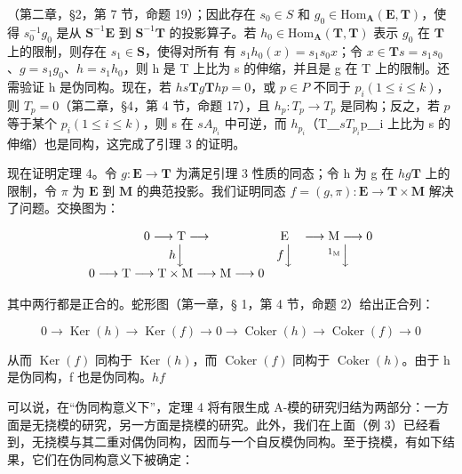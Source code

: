 （第二章，§2，第 7 节，命题 19）；因此存在 \(s_0 \in S\) 和 \(g_0 \in \mathrm{Hom}_{\mathbf{A}}(\mathbf{E}, \mathbf{T})\)，使得 \(s_0^{-1}g_0\) 是从 \(\mathbf{S}^{-1}\mathbf{E}\) 到 \(\mathbf{S}^{-1}\mathbf{T}\) 的投影算子。若 \(h_0 \in \mathrm{Hom}_{\mathbf{A}}(\mathbf{T}, \mathbf{T})\) 表示 \(g_0\) 在 \(\mathbf{T}\) 上的限制，则存在 \(s_1 \in \mathbf{S}\)，使得对所有  有 \(s_1h_0(x) = s_1s_0x\)；令 \(x \in \mathbf{T}\)\(s = s_1s_0\)、\(g = s_1g_0\)、\(h = s_1h_0\)，则 h 是 T 上比为 s 的伸缩，并且是 g 在 T 上的限制。还需验证 h 是伪同构。现在，若 \(h\)\(s\)\(\mathbf{T}\)\(g\)\(\mathbf{T}\)\(h\)\(p = 0\)，或 \(p \in P\) 不同于 \(p_i (1 \leqslant i \leqslant k)\)，则 \(T_p = 0\)（第二章，§4，第 4 节，命题 17），且 \(h_p: T_p \to T_p\) 是同构；反之，若 \(p\) 等于某个 \(p_i (1 \leqslant i \leqslant k)\)，则 s 在 \(s\)\(A_{p_i}\) 中可逆，而 \(h_{p_i}\)（T＿\(s\)\(T_{p_i}\)p＿i 上比为 s 的伸缩）也是同构，这完成了引理 3 的证明。

现在证明定理 4。令 \(g: \mathbf{E} \to \mathbf{T}\) 为满足引理 3 性质的同态；令 h 为 g 在 \(h\)\(g\)\(\mathbf{T}\) 上的限制，令 \(\pi\) 为 \(\mathbf{E}\) 到 \(\mathbf{M}\) 的典范投影。我们证明同态 \(f = (g, \pi): \mathbf{E} \to \mathbf{T} \times \mathbf{M}\) 解决了问题。交换图为：

\[
\begin{array}{c c c} 0 \longrightarrow \mathrm{T} \longrightarrow & \mathrm{E} & \longrightarrow \mathrm{M} \longrightarrow 0 \\ h \Big \downarrow & f \Big \downarrow & ^ {1 _ {\mathrm{M}}} \Big \downarrow \\ 0 \longrightarrow \mathrm{T} \longrightarrow \mathrm{T} \times \mathrm{M} \longrightarrow \mathrm{M} \longrightarrow 0 \end{array}
\]

其中两行都是正合的。蛇形图（第一章，§ 1，第 4 节，命题 2）给出正合列：

\[
0 \rightarrow \operatorname{Ker} (h) \rightarrow \operatorname{Ker} (f) \rightarrow 0 \rightarrow \operatorname{Coker} (h) \rightarrow \operatorname{Coker} (f) \rightarrow 0
\]

从而 \(\operatorname{Ker}(f)\) 同构于 \(\operatorname{Ker}(h)\)，而 \(\operatorname{Coker}(f)\) 同构于 \(\operatorname{Coker}(h)\)。由于 h 是伪同构，f 也是伪同构。\(h\)\(f\)

可以说，在``伪同构意义下''，定理 4 将有限生成 A-模的研究归结为两部分：一方面是无挠模的研究，另一方面是挠模的研究。此外，我们在上面（例 3）已经看到，无挠模与其二重对偶伪同构，因而与一个自反模伪同构。至于挠模，有如下结果，它们在伪同构意义下被确定：

